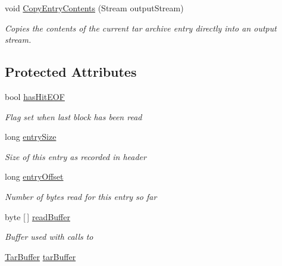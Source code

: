 \begin{DoxyCompactItemize}
void \hyperlink{class_i_c_sharp_code_1_1_sharp_zip_lib_1_1_tar_1_1_tar_input_stream_a0041b9be788dc2344bf3da9114f580b3}{Copy\+Entry\+Contents} (Stream output\+Stream)
\begin{DoxyCompactList}\small\item\em Copies the contents of the current tar archive entry directly into an output stream. \end{DoxyCompactList}\end{DoxyCompactItemize}
\subsection*{Protected Attributes}
\begin{DoxyCompactItemize}
\item 
bool \hyperlink{class_i_c_sharp_code_1_1_sharp_zip_lib_1_1_tar_1_1_tar_input_stream_ac52db37b1ab369dff8b6c4665f71dd3e}{has\+Hit\+E\+OF}
\begin{DoxyCompactList}\small\item\em Flag set when last block has been read \end{DoxyCompactList}\item 
long \hyperlink{class_i_c_sharp_code_1_1_sharp_zip_lib_1_1_tar_1_1_tar_input_stream_a0e9a89e0348ff93611166c3874a43cc6}{entry\+Size}
\begin{DoxyCompactList}\small\item\em Size of this entry as recorded in header \end{DoxyCompactList}\item 
long \hyperlink{class_i_c_sharp_code_1_1_sharp_zip_lib_1_1_tar_1_1_tar_input_stream_a2e87bca20437dbf1b4be118c8fc26694}{entry\+Offset}
\begin{DoxyCompactList}\small\item\em Number of bytes read for this entry so far \end{DoxyCompactList}\item 
byte \mbox{[}$\,$\mbox{]} \hyperlink{class_i_c_sharp_code_1_1_sharp_zip_lib_1_1_tar_1_1_tar_input_stream_a0efa6969952e2e8ae99e13dfa3ba65a0}{read\+Buffer}
\begin{DoxyCompactList}\small\item\em Buffer used with calls to \end{DoxyCompactList}\item 
\hyperlink{class_i_c_sharp_code_1_1_sharp_zip_lib_1_1_tar_1_1_tar_buffer}{Tar\+Buffer} \hyperlink{class_i_c_sharp_code_1_1_sharp_zip_lib_1_1_tar_1_1_tar_input_stream_ae56b1918805513aaf7bd03ded9a2bfad}{tar\+Buffer}

\end{DoxyCompactItemize}
